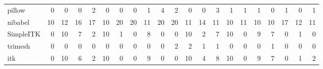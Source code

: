 \begin{tabular}{lrrrrrrrrrrrrrrrrrrrr}
pillow & 0 & 0 & 0 & 2 & 0 & 0 & 0 & 1 & 4 & 2 & 0 & 0 & 3 & 1 & 1 & 1 & 0 & 1 & 0 & 1 \\
nibabel & 10 & 12 & 16 & 17 & 10 & 20 & 20 & 11 & 20 & 20 & 11 & 14 & 11 & 10 & 11 & 10 & 10 & 17 & 12 & 11 \\
SimpleITK & 0 & 10 & 7 & 2 & 10 & 1 & 0 & 8 & 0 & 0 & 10 & 2 & 7 & 10 & 0 & 9 & 7 & 0 & 1 & 0 \\
trimesh & 0 & 0 & 0 & 0 & 0 & 0 & 0 & 0 & 0 & 2 & 2 & 1 & 1 & 0 & 0 & 0 & 1 & 0 & 0 & 0 \\
itk & 0 & 10 & 6 & 2 & 10 & 0 & 0 & 9 & 0 & 0 & 10 & 4 & 8 & 10 & 0 & 9 & 7 & 0 & 1 & 2 \\
\bottomrule
\end{tabular}
